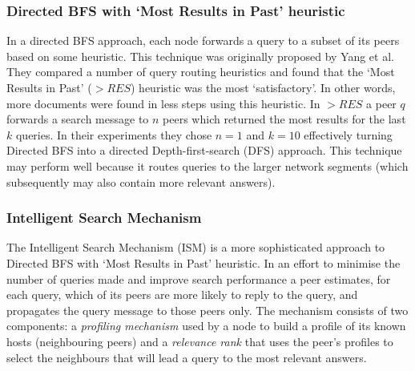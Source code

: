 
\subsubsection{Directed BFS with `Most Results in Past' heuristic}

In a directed BFS approach, each node forwards a query to a subset of its peers based on some heuristic. This technique was originally proposed by Yang et al. They compared a number of query routing heuristics and found that the `Most Results in Past' ($>RES$) heuristic was the most `satisfactory'\cite{yang2002efficient}. In other words, more documents were found in less steps using this heuristic. In $>RES$ a peer $q$ forwards a search message to $n$ peers which returned the most results for the last $k$ queries. In their experiments they chose $n=1$ and $k=10$ effectively turning Directed BFS into a directed Depth-first-search (DFS) approach. This technique may perform well because it routes queries to the larger network segments (which subsequently may also contain more relevant answers)\cite{zeinalipour2004information}.

\subsubsection{Intelligent Search Mechanism}

The Intelligent Search Mechanism (ISM) is a more sophisticated approach to Directed BFS with `Most Results in Past' heuristic\cite{kalogeraki2002local}. In an effort to minimise the number of queries made and improve search performance a peer estimates, for each query, which of its peers are more likely to reply to the query, and propagates the query message to those peers only. The mechanism consists of two components: a \textit{profiling mechanism} used by a node to build a profile of its known hosts (neighbouring peers) and a \textit{relevance rank} that uses the peer’s profiles to select the neighbours that will lead a query to the most relevant answers.

